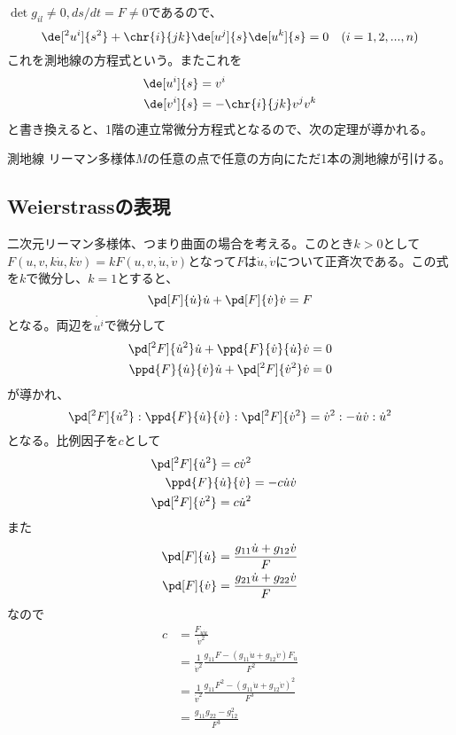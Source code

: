     $\det g_{il} \neq 0, ds/dt = F \neq 0$であるので、
        \[\de[^2u^i]{s^2} + \chr{i}{jk}\de[u^j]{s}\de[u^k]{s} = 0\quad (i=1,2,...,n)\]
    これを測地線の方程式という。またこれを
    \begin{align*}
        \de[u^i]{s} &= v^i\\
        \de[v^i]{s} &= -\chr{i}{jk}v^jv^k
    \end{align*}
    と書き換えると、1階の連立常微分方程式となるので、次の定理が導かれる。
    \begin{thm}{測地線}
        リーマン多様体$M$の任意の点で任意の方向にただ1本の測地線が引ける。
    \end{thm}

    \subsection{Weierstrassの表現}
        二次元リーマン多様体、つまり曲面の場合を考える。このとき$k > 0$として$F(u,v,k\dot{u},k\dot{v}) = kF(u,v,\dot{u},\dot{v})$となって$F$は$\dot{u},\dot{v}$について正斉次である。この式を$k$で微分し、$k = 1$とすると、
            \[\pd[F]{\dot{u}}\dot{u} + \pd[F]{\dot{v}}\dot{v} = F\]
        となる。両辺を$\dot{u^i}$で微分して
        \begin{align*}
            \pd[^2F]{\dot{u}^2}\dot{u}+\ppd{F}{\dot{v}}{\dot{u}}\dot{v} = 0\\
            \ppd{F}{\dot{u}}{\dot{v}}\dot{u}+\pd[^2F]{\dot{v}^2}\dot{v} = 0\\
        \end{align*}
        が導かれ、
            \[\pd[^2F]{\dot{u}^2} : \ppd{F}{\dot{u}}{\dot{v}} : \pd[^2F]{\dot{v}^2} = \dot{v}^2 : -\dot{u}\dot{v} : \dot{u}^2\]
        となる。比例因子を$c$として
        \begin{align*}
            \pd[^2F]{\dot{u}^2} = c\dot{v}^2\\
            \ppd{F}{\dot{u}}{\dot{v}} &= -c\dot{u}\dot{v}\\
            \pd[^2F]{\dot{v}^2} = c\dot{u}^2\\
        \end{align*}
        また
        \begin{align*}
            \pd[F]{\dot{u}} = \frac{g_{11}\dot{u} + g_{12}\dot{v}}{F}\\
            \pd[F]{\dot{v}} = \frac{g_{21}\dot{u} + g_{22}\dot{v}}{F}\\
        \end{align*}
        なので
        \begin{align*}
            c &= \frac{F_{\dot{u}\dot{u}}}{\dot{v}^2}\\
            &= \frac{1}{\dot{v}^2}\frac{g_{11}F - (g_{11}\dot{u} + g_{12}\dot{v})F_{\dot{u}}}{F^2}\\
            &= \frac{1}{\dot{v}^2}\frac{g_{11}F^2 - (g_{11}\dot{u} + g_{12}\dot{v})^2}{F^3}\\
            &= \frac{g_{11}g_{22} - g_{12}^2}{F^3}
        \end{align*}
